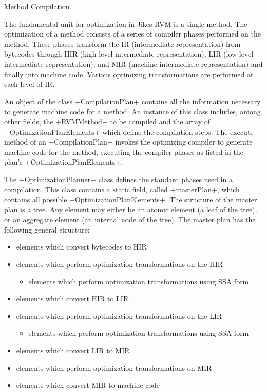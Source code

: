 \begin{subsection}{Method Compilation}
\label{subsec:methodcompilation}

The fundamental unit for optimization in Jikes RVM is a single method. The optimization of a method consists of a series of compiler phases performed on the method. These phases transform the IR (intermediate representation) from bytecodes through HIR (high-level intermediate representation), LIR (low-level intermediate representation), and MIR (machine intermediate representation) and finally into machine code. Various optimizing transformations are performed at each level of IR.

An object of the class \spverb+CompilationPlan+ contains all the information necessary to generate machine code for a method. An instance of this class includes, among other fields, the \spverb+RVMMethod+ to be compiled and the array of \spverb+OptimizationPlanElements+ which define the compilation steps. The execute method of an \spverb+CompilationPlan+ invokes the optimizing compiler to generate machine code for the method, executing the compiler phases as listed in the plan's \spverb+OptimizationPlanElements+.

The \spverb+OptimizationPlanner+ class defines the standard phases used in a compilation. This class contains a static field, called \spverb+masterPlan+, which contains all possible \spverb+OptimizationPlanElements+. The structure of the master plan is a tree. Any element may either be an atomic element (a leaf of the tree), or an aggregate element (an internal node of the tree). The master plan has the following general structure:
\begin{itemize}
  \item elements which convert bytecodes to HIR
  \item elements which perform optimization transformations on the HIR
    \begin{itemize}
      \item elements which perform optimization transformations using SSA form
    \end{itemize}
  \item elements which convert HIR to LIR
  \item elements which perform optimization transformations on the LIR
    \begin{itemize}
      \item elements which perform optimization transformations using SSA form
    \end{itemize}
  \item elements which convert LIR to MIR
  \item elements which perform optimization transformations on MIR
  \item elements which convert MIR to machine code
\end{itemize}


\end{subsection}
